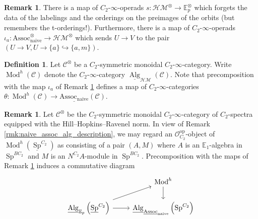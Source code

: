\documentclass{article}
\DeclareMathOperator{\Alg}{Alg}
\DeclareMathOperator{\Mod}{Mod} %
\DeclareMathOperator{\Spectra}{Sp} %
\newcommand{\EE}{\mathbb{E}}
\newcommand{\op}{\mathrm{op}}
\theoremstyle{definition}
\newtheorem{definition}[equation]{Definition}
\newtheorem{remark}[equation]{Remark}
\begin{document}
\begin{remark}\label{rmk:param_operad_maps}
    There is a map of $ C_2 $-$ \infty $-operads $ s \colon \mathcal{HM}^\otimes \to \mathbb{E}_p^\otimes $ which forgets the data of the labelings and the orderings on the preimages of the orbits (but remembers the t-orderings!).  
    Furthermore, there is a map of $ C_2 $-$ \infty $-operads $ \iota_a \colon \mathrm{Assoc}_{\mathrm{naive}}^\otimes \to \mathcal{HM}^\otimes $ which sends $ U \to V $ to the pair $ (U \to V, U \to\{a\} \hookrightarrow \{a,m\}) $. 
\end{remark}
\begin{definition}\label{defn:genuine_hermitian_modules}
    Let $ \mathcal{C}^\otimes $ be a $ C_2 $-symmetric monoidal $ C_2 $-$ \infty $-category. 
    Write $ \Mod^h(\mathcal{C}) $ denote the $ C_2 $-$ \infty $-category $ \underline{\Alg}_{\mathcal{HM}}(\mathcal{C}) $. 
    Note that precomposition with the map $ \iota_a $ of Remark \ref{rmk:param_operad_maps} defines a map of $ C_2 $-$ \infty $-categories $ \theta \colon \Mod^h(\mathcal{C}) \to \underline{\mathrm{Assoc}_{\mathrm{naive}}}(\mathcal{C}) $. 
\end{definition}
\begin{remark}\label{rmk:from_param_operad_maps_to_alg_mod_maps}
    Let $ \mathcal{C}^\otimes $ be the $ C_2 $-symmetric monoidal $ C_2 $-$ \infty $-category of $ C_2 $-spectra equipped with the Hill--Hopkins--Ravenel norm.  
    In view of Remark \ref{rmk:naive_assoc_alg_description}, we may regard an $ \mathcal{O}^\op_{C_2} $-object of $ \Mod^h\left(\underline{\Spectra}^{C_2}\right) $ as consisting of a pair $ (A,M) $ where $ A $ is an $ \EE_1 $-algebra in $ \Spectra^{BC_2} $ and $ M $ is an $ N^{C_2}A $-module in $ \Spectra^{BC_2} $. 
    Precomposition with the maps of Remark \ref{rmk:param_operad_maps} induces a commutative diagram
    \begin{equation*}
    \begin{tikzcd}
        & \Mod^h \ar[d] \\
        \underline{\Alg}_{\EE_p}\left(\underline{\Spectra}^{C_2}\right) \ar[r] \ar[ru] & \underline{\Alg}_{\underline{\mathrm{Assoc}}_{\mathrm{naive}}}\left(\Spectra^{C_2}\right)          
    \end{tikzcd}     
    \end{equation*} 
\end{remark}
\end{document}
